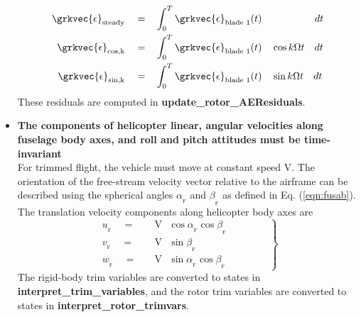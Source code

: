 \begin{itemize}
\begin{align}
\grkvec{\epsilon}_\textrm{steady} \quad = \quad &\int_{0}^T \grkvec{\epsilon}_\textrm{blade 1} (t) \qquad \qquad \quad \textrm{ } dt\\
\grkvec{\epsilon}_\textrm{cos,k} \quad = \quad &\int_{0}^T \grkvec{\epsilon}_\textrm{blade 1} (t) \quad \cos k \Omega t \quad dt\\
\grkvec{\epsilon}_\textrm{sin,k} \quad = \quad &\int_{0}^T \grkvec{\epsilon}_\textrm{blade 1} (t) \quad \sin k \Omega t \quad dt
\end{align}
These residuals are computed in \textbf{update\_rotor\_AEResiduals}. 
\item \textbf{The components of helicopter linear, angular velocities along fuselage body axes, and roll and pitch attitudes must be time-invariant} \\
For trimmed flight, the vehicle must move at constant speed V. The orientation of the free-stream velocity vector relative to the airframe can be described using the spherical angles $\alpha_{_\textrm{F}}$ and $\beta_{_\textrm{F}}$ as defined in Eq. (\ref{eqn:fusab}). The translation velocity components along helicopter body axes are 
\begin{equation}
\label{eqn:uvwf}
\left.
\begin{aligned}
u_{_\textrm{F}} \quad = \quad &\textrm{V} \textrm{ }\cos \alpha_{_\textrm{F}} \cos \beta_{_\textrm{F}} \\
v_{_\textrm{F}} \quad = \quad &\textrm{V} \textrm{ }\sin \beta_{_\textrm{F}} \\
w_{_\textrm{F}} \quad = \quad &\textrm{V} \textrm{ }\sin \alpha_{_\textrm{F}} \cos \beta_{_\textrm{F}} \qquad \qquad
\end{aligned}
\right\}
\end{equation}
The rigid-body trim variables are converted to states in \textbf{interpret\_trim\_variables}, and the rotor trim variables are converted to states in \textbf{interpret\_rotor\_trimvars}. 


\end{itemize}
